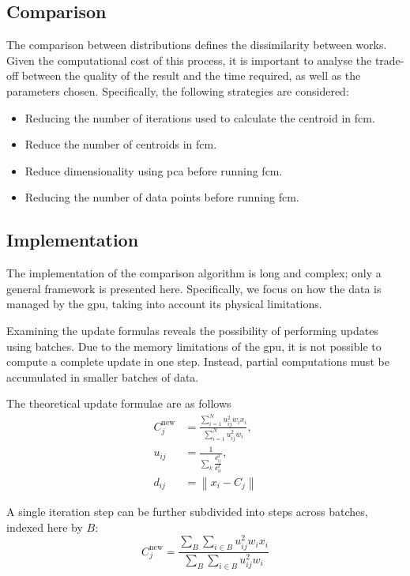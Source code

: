 \begin{toReview}
    \section{Comparison} The comparison between distributions defines the dissimilarity between works. Given the computational cost of this process, it is important to analyse the trade-off between the quality of the result and the time required, as well as the parameters chosen. Specifically, the following strategies are considered:
    \begin{itemize}
    	\item Reducing the number of iterations used to calculate the centroid in \gls{fcm}.
    	\item Reduce the number of centroids in \gls{fcm}.
    	\item Reduce dimensionality using \gls{pca} before running \gls{fcm}.
    	\item Reducing the number of data points before running \gls{fcm}.
    \end{itemize}

	\subsection{Implementation} The implementation of the comparison algorithm is long and complex; only a general framework is presented here. Specifically, we focus on how the data is managed by the \gls{gpu}, taking into account its physical limitations.

	\noindent Examining the update formulas reveals the possibility of performing updates using batches. Due to the memory limitations of the \gls{gpu}, it is not possible to compute a complete update in one step. Instead, partial computations must be accumulated in smaller batches of data.

	\noindent The theoretical update formulae are as follows
	\begin{align*}
		C_{j}^\text{new} &= \frac{\sum_{i=1}^N u_{ij}^2w_ix_i}{\sum_{i=1}^N u_{ij}^2w_i}, \\
		u_{ij} &= \frac{1}{\sum_k\frac{d_{ij}^2}{d_{ik}^2}}, \\
		d_{ij} &= \left\|x_i - C_{j}\right\|
	\end{align*}

	\noindent A single iteration step can be further subdivided into steps across batches, indexed here by $B$:
	\begin{equation*}
		C_{j}^\text{new} = \frac{\sum_{B}\sum_{i\in B} u_{ij}^2w_ix_i}{\sum_{B}\sum_{i\in B} u_{ij}^2w_i}
	\end{equation*}


\end{toReview}
